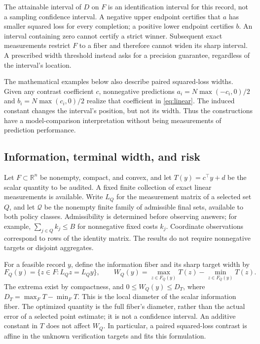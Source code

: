\documentclass[12pt]{article}
\begin{document}
The attainable interval of $D$ on $F$ is an identification interval for
this record, not a sampling confidence interval. A negative upper endpoint
certifies that $a$ has smaller squared loss for every completion; a positive
lower endpoint certifies $b$. An interval containing zero cannot certify
a strict winner. Subsequent exact measurements restrict $F$ to a fiber and
therefore cannot widen its sharp interval. A prescribed width threshold
instead asks for a precision guarantee, regardless of the interval's location.

The mathematical examples below also describe paired squared-loss widths.
Given any contrast coefficient $c$, nonnegative predictions
$a_i=N\max(-c_i,0)/2$ and $b_i=N\max(c_i,0)/2$ realize that coefficient
in \eqref{eq:linear}. The induced constant changes the interval's position,
but not its width. Thus the constructions have a model-comparison
interpretation without being measurements of prediction performance.

\subsection{Information, terminal width, and risk}
\label{sec:risk_setup}
Let $F\subset\mathbb R^n$ be nonempty, compact, and convex, and let
$T(y)=c^\top y+d$ be the scalar quantity to be audited. A fixed finite
collection of exact linear measurements is available. Write $L_Q$ for
the measurement matrix of a selected set $Q$, and let $\mathcal Q$ be
the nonempty finite family of admissible final sets, available to both
policy classes. Admissibility is determined before observing answers; for example,
$\sum_{j\in Q}k_j\le B$ for nonnegative fixed costs $k_j$.
Coordinate observations correspond to rows of the identity matrix.
The results do not require nonnegative targets or disjoint aggregates.

For a feasible record $y$, define the information fiber and its sharp
target width by
\begin{equation}
 F_Q(y)=\{z\in F:L_Qz=L_Qy\},\qquad
 W_Q(y)=\max_{z\in F_Q(y)}T(z)-\min_{z\in F_Q(y)}T(z).
 \label{eq:risk_fiber}
\end{equation}
The extrema exist by compactness, and $0\le W_Q(y)\le D_T$, where
$D_T=\max_F T-\min_F T$. This is the local diameter of the
scalar information fiber. The optimized quantity is the full fiber's
diameter, rather than the actual error of a selected point estimate;
it is not a confidence interval. An additive constant in $T$ does
not affect $W_Q$. In particular, a paired squared-loss contrast is
affine in the unknown verification targets and fits this formulation.
\end{document}
